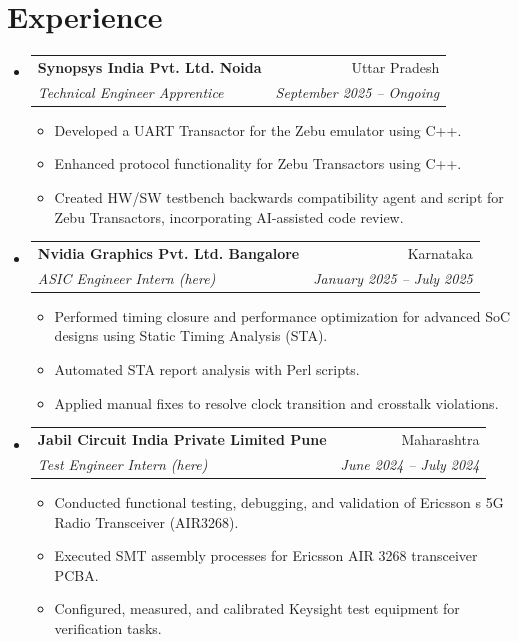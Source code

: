 \documentclass[letterpaper,11pt]{article}
\makeatletter
\newcommand{\resumeItem}[1]{\item\small{#1 \vspace{-2pt}}}
\newcommand{\resumeSubheading}[4]{
  \vspace{-2pt}\item
    \begin{tabular*}{\textwidth}[t]{l@{\extracolsep{\fill}}r}
      \textbf{#1} & #2 \\
      \textit{\small#3} & \textit{\small #4} \\
    \end{tabular*}\vspace{-7pt}
}
\newcommand{\resumeSubHeadingListStart}{\begin{itemize}[leftmargin=0.15in, label={}]}
\newcommand{\resumeSubHeadingListEnd}{\end{itemize}}
\newcommand{\resumeItemListStart}{\begin{itemize}}
\newcommand{\resumeItemListEnd}{\end{itemize}\vspace{-5pt}}
\makeatother
\begin{document}
\section{Experience}
\resumeSubHeadingListStart
  \resumeSubheading
    { Synopsys India Pvt. Ltd. Noida }{ Uttar Pradesh }
    { Technical Engineer Apprentice }{ September 2025 -- Ongoing }
    \resumeItemListStart
      \resumeItem{ Developed a UART Transactor for the Zebu emulator using C++. }
      \resumeItem{ Enhanced protocol functionality for Zebu Transactors using C++. }
      \resumeItem{ Created HW/SW testbench backwards compatibility agent and script for Zebu Transactors, incorporating AI-assisted code review. }
    \resumeItemListEnd
  \resumeSubheading
    { Nvidia Graphics Pvt. Ltd. Bangalore }{ Karnataka }
    { ASIC Engineer Intern (here) }{ January 2025 -- July 2025 }
    \resumeItemListStart
      \resumeItem{ Performed timing closure and performance optimization for advanced SoC designs using Static Timing Analysis (STA). }
      \resumeItem{ Automated STA report analysis with Perl scripts. }
      \resumeItem{ Applied manual fixes to resolve clock transition and crosstalk violations. }
    \resumeItemListEnd
  \resumeSubheading
    { Jabil Circuit India Private Limited Pune }{ Maharashtra }
    { Test Engineer Intern (here) }{ June 2024 -- July 2024 }
    \resumeItemListStart
      \resumeItem{ Conducted functional testing, debugging, and validation of Ericsson s 5G Radio Transceiver (AIR3268). }
      \resumeItem{ Executed SMT assembly processes for Ericsson AIR 3268 transceiver PCBA. }
      \resumeItem{ Configured, measured, and calibrated Keysight test equipment for verification tasks. }
    \resumeItemListEnd
\resumeSubHeadingListEnd
\end{document}
